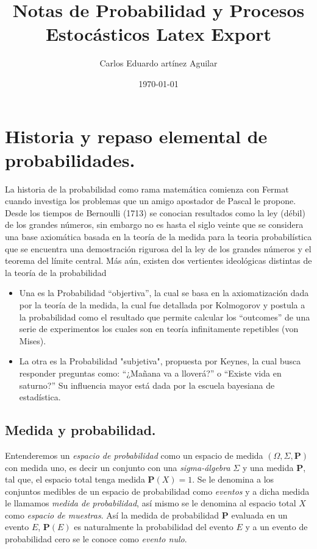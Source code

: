 \documentclass[letterpaper]{article}
\author{Carlos Eduardo artínez Aguilar}
\date{\today}
\title{Notas de Probabilidad y Procesos Estocásticos Latex Export}
\begin{document}
\maketitle
\tableofcontents


\section{Historia y repaso elemental de probabilidades.}
\label{sec:org1ab7dcb}

\noindent La historia de la probabilidad como rama matemática comienza con Fermat cuando investiga los problemas que un amigo apostador de Pascal le propone. Desde los tiempos de Bernoulli (1713) se conocian resultados como la ley (débil) de los grandes números, sin embargo no es hasta el siglo veinte que se considera una base axiomática basada en la teoría de la medida para la teoria probabilística que se encuentra una demostración rigurosa del la ley de los grandes números y el teorema del límite central. Más aún, existen dos vertientes ideológicas distintas de la teoría de la probabilidad

\begin{itemize}
\item Una es la Probabilidad ``objertiva'', la cual se basa en la axiomatización dada por la teoría de la medida, la cual fue detallada por Kolmogorov y postula a la probabilidad como el resultado que permite calcular los ``outcomes'' de una serie de experimentos los cuales son en teoría infinitamente repetibles (von Mises).

\item La otra es la Probabilidad "subjetiva", propuesta por Keynes, la cual busca responder preguntas como: ``¿Mañana va a lloverá?'' o ``Existe vida en saturno?'' Su influencia mayor está dada por la escuela bayesiana de estadística.
\end{itemize}

\subsection{Medida y probabilidad.}
\label{sec:org0a67c84}

\noindent Entenderemos un \emph{espacio de probabilidad} como un espacio de medida \((\Omega,\Sigma,\textbf{P})\) con medida uno, es decir un conjunto con una \emph{sigma-álgebra} \(\Sigma\) y una medida \textbf{P}, tal que, el espacio total tenga medida \(\textbf{P}(X)=1\). Se le denomina a los conjuntos medibles de un espacio de probabilidad como \emph{eventos} y a dicha medida le llamamos \emph{medida de probabilidad}, así mismo se le denomina al espacio total \(X\) como \emph{espacio de muestras}. Así la medida de probabilidad \textbf{P} evaluada en un evento \(E\), \(\textbf{P}(E)\) es naturalmente la probabilidad del evento \(E\) y a un evento de probabilidad cero se le conoce como \emph{evento nulo}.
\end{document}
